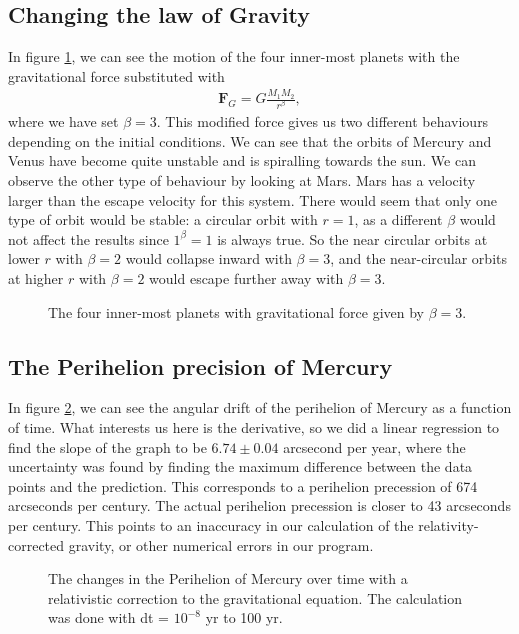 \documentclass[a4paper, 10pt, reqno]{amsart}
\begin{document}
\subsection{Changing the law of Gravity}
In figure \ref{fig:3grav}, we can see the motion of the four inner-most planets with the gravitational force substituted with
\begin{align}
    \mathbf{F}_G = G \frac{M_1 M_2}{r^\beta},
\end{align}
where we have set $\beta = 3$. This modified force gives us two different behaviours depending on the initial conditions. We can see that the orbits of Mercury and Venus have become quite unstable and is spiralling towards the sun. We can observe the other type of behaviour by looking at Mars. Mars has a velocity larger than the escape velocity for this system. There would seem that only one type of orbit would be stable: a circular orbit with $r = 1$, as a different $\beta$ would not affect the results since $1^\beta = 1$ is always true. So the near circular orbits at lower $r$ with $\beta = 2$ would collapse inward with $\beta = 3$, and the near-circular orbits at higher $r$ with $\beta = 2$ would escape further away with $\beta = 3$.

\begin{figure}
    \centering
    
    \caption{The four inner-most planets with gravitational force given by $\beta = 3$.}
    \label{fig:3grav}
\end{figure}

\subsection{The Perihelion precision of Mercury}
In figure \ref{fig:perihel}, we can see the angular drift of the perihelion of Mercury as a function of time. What interests us here is the derivative, so we did a linear regression to find the slope of the graph to be $6.74 \pm 0.04$ arcsecond per year, where the uncertainty was found by finding the maximum difference between the data points and the prediction. This corresponds to a perihelion precession of 674 arcseconds per century. The actual perihelion precession is closer to 43 arcseconds per century. This points to an inaccuracy in our calculation of the relativity-corrected gravity, or other numerical errors in our program.

 \begin{figure}
     \centering
     
     \caption{The changes in the Perihelion of Mercury over time with a relativistic correction to the gravitational equation. The calculation was done with dt = $10^{-8}$ yr to 100 yr.}
     \label{fig:perihel}
 \end{figure}
\end{document}
